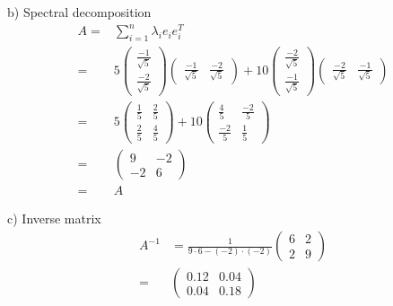\documentclass[a4paper,10pt]{article}
\begin{document}
 b) Spectral decomposition\\
 \begin{align*}
  A = & \sum_{i=1}^n \lambda_i e_i e_i^T\\
  = & 5 \begin{pmatrix} \frac{-1}{\sqrt{5}} \\ \frac{-2}{\sqrt{5}} \end{pmatrix} \begin{pmatrix} \frac{-1}{\sqrt{5}} & \frac{-2}{\sqrt{5}} \end{pmatrix} + 10 \begin{pmatrix} \frac{-2}{\sqrt{5}} \\ \frac{-1}{\sqrt{5}} \end{pmatrix} \begin{pmatrix} \frac{-2}{\sqrt{5}} & \frac{-1}{\sqrt{5}} \end{pmatrix} \\
  = & 5 \begin{pmatrix} \frac{1}{5} & \frac{2}{5} \\ \frac{2}{5} & \frac{4}{5} \end{pmatrix} + 10 \begin{pmatrix} \frac{4}{5} & \frac{-2}{5} \\ \frac{-2}{5} & \frac{1}{5} \end{pmatrix}\\
  = & \begin{pmatrix} 9 & -2 \\ -2 & 6 \end{pmatrix} \\
  = & A
 \end{align*}
 
 c) Inverse matrix\\
 \begin{align*}
  A^{-1} & = \frac{1}{9 \cdot 6 - (-2) \cdot (-2)} \begin{pmatrix} 6 & 2 \\ 2 & 9 \end{pmatrix}\\
  = & \begin{pmatrix} 0.12 & 0.04 \\ 0.04 & 0.18 \end{pmatrix}
 \end{align*}
\end{document}
